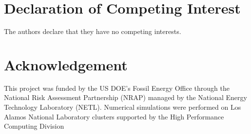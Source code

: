 \documentclass[10pt, twoside]{article}
\begin{document}
\section*{\textbf{Declaration of Competing Interest}}
The authors declare that they have no competing interests. 

\section*{\textbf{Acknowledgement}}
This project was funded by the US DOE’s Fossil Energy Office through the National Risk Assessment Partnership (NRAP) managed by the National Energy Technology Laboratory (NETL). Numerical simulations were performed on Los Alamos National Laboratory clusters supported by the High Performance Computing Division 



\end{document}
